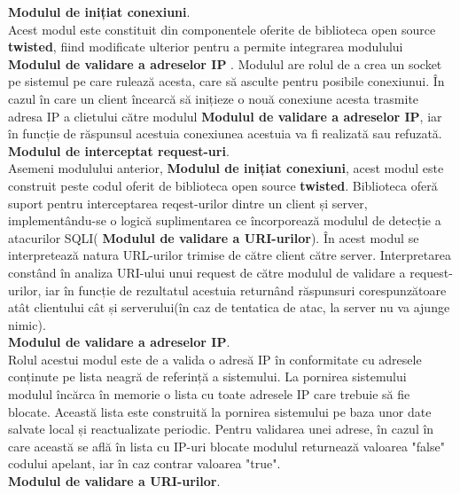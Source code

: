 \textbf{Modulul de inițiat conexiuni}.\\

Acest modul este constituit din componentele oferite de biblioteca open source \textbf{twisted}, fiind modificate ulterior pentru a permite integrarea modulului \textbf{Modulul de validare a adreselor IP} . Modulul are rolul de a crea un socket pe sistemul pe care rulează acesta, care să asculte pentru posibile conexiunui. În cazul în care un client încearcă să inițieze o nouă conexiune acesta trasmite adresa IP a clietului către modulul \textbf{Modulul de validare a adreselor IP}, iar în funcție de răspunsul acestuia conexiunea acestuia va fi realizată sau refuzată. \\ 


 \textbf{Modulul de interceptat request-uri}.\\
 
Asemeni modulului anterior, \textbf{Modulul de inițiat conexiuni}, acest modul este construit peste codul oferit de biblioteca open source \textbf{twisted}. Biblioteca oferă suport pentru interceptarea reqest-urilor dintre un client și server, implementându-se o logică suplimentarea ce încorporează modulul de detecție a atacurilor SQLI( \textbf{Modulul de validare a URI-urilor}). În acest modul se interpretează natura URL-urilor trimise de către client către server.
Interpretarea constând în analiza URI-ului unui request de către modulul de validare a request-urilor, iar în funcție de rezultatul acestuia returnând răspunsuri corespunzătoare atât clientului cât și serverului(în caz de tentatica de atac, la server nu va ajunge nimic).  \\
 
	\textbf{Modulul de validare a adreselor IP}. \\

Rolul acestui modul este de  a valida o adresă IP în conformitate cu adresele conținute pe lista neagră de referință a sistemului. La pornirea sistemului modulul încărca în memorie o lista cu toate adresele IP care trebuie să fie blocate. Această lista este construită la pornirea sistemului pe baza unor date salvate local și reactualizate periodic. Pentru validarea unei adrese, în cazul în care această se află în lista cu IP-uri blocate modulul returnează valoarea "false" codului apelant, iar în caz contrar valoarea "true".  \\

 \textbf{Modulul de validare a URI-urilor}. \\
  

